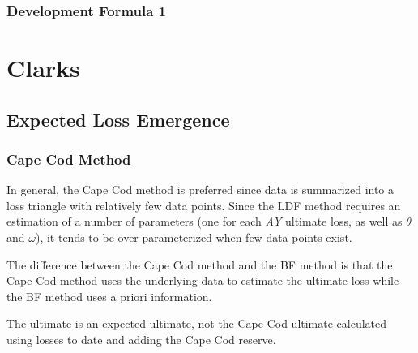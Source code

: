 \documentclass{article}
\begin{document}
\subsubsection{Development Formula 1}

\section{Clarks}
\subsection{Expected Loss Emergence}
\subsubsection{Cape Cod Method}
In general, the Cape Cod method is preferred since data is summarized
into a loss triangle with
relatively few data points. Since the LDF method requires an
estimation of a number of parameters (one for each \emph{AY} ultimate
loss, as well as $\theta$ and $\omega$), it tends to be
over-parameterized when few data points exist.

The difference between the Cape Cod method and the BF method is that
the Cape Cod method uses the underlying data to estimate the ultimate
loss while the BF method uses a priori information.

The ultimate is an expected ultimate, not the Cape Cod ultimate
calculated using losses to date and adding the Cape Cod reserve.
\end{document}
